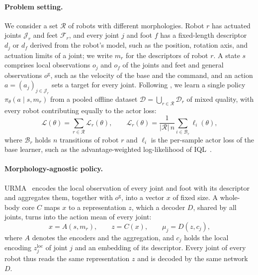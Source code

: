 \paragraph{Problem setting.}
We consider a set $\mathcal{R}$ of robots with different morphologies. Robot $r$ has actuated joints $\mathcal{J}_r$
and feet $\mathcal{F}_r$, and every joint $j$ and foot $f$ has a fixed-length descriptor $d_j$ or $d_f$ derived from
the robot's model, such as the position, rotation axis, and actuation limits of a joint; we write $m_r$ for the
descriptors of robot $r$. A state $s$ comprises local observations $o_j$ and $o_f$ of the joints and feet and general
observations $o^{\mathrm{g}}$, such as the velocity of the base and the command, and an action
$a=(a_j)_{j\in\mathcal{J}_r}$ sets a target for every joint. Following \citet{abe2026crossembodimentoffline}, we learn
a single policy $\pi_\theta(a\mid s,m_r)$ from a pooled offline dataset
$\mathcal{D}=\bigcup_{r\in\mathcal{R}}\mathcal{D}_r$ of mixed quality, with every robot contributing equally to the
actor loss:
\begin{equation}
\mathcal{L}(\theta)=\sum_{r\in\mathcal{R}}\mathcal{L}_r(\theta),\qquad
\mathcal{L}_r(\theta)=\frac{1}{|\mathcal{R}|\,n}\sum_{i\in\mathcal{B}_r}\ell_i(\theta),
\label{eq:actor_loss}
\end{equation}
where $\mathcal{B}_r$ holds $n$ transitions of robot $r$ and $\ell_i$ is the per-sample actor loss of the base
learner, such as the advantage-weighted log-likelihood of IQL~\citep{kostrikov2022iql}.

\paragraph{Morphology-agnostic policy.}
URMA~\citep{bohlinger2024onepolicy} encodes the local observation of every joint and foot with its descriptor and
aggregates them, together with $o^{\mathrm{g}}$, into a vector $x$ of fixed size. A whole-body core $C$ maps $x$ to a
representation $z$, which a decoder $D$, shared by all joints, turns into the action mean of every joint:
\begin{equation}
x=A(s,m_r),\qquad z=C(x),\qquad \mu_j=D(z,c_j),
\label{eq:urma}
\end{equation}
where $A$ denotes the encoders and the aggregation, and $c_j$ holds the local encoding $z^{\mathrm{loc}}_j$ of joint
$j$ and an embedding of its descriptor. Every joint of every robot thus reads the same representation $z$ and is
decoded by the same network $D$.

